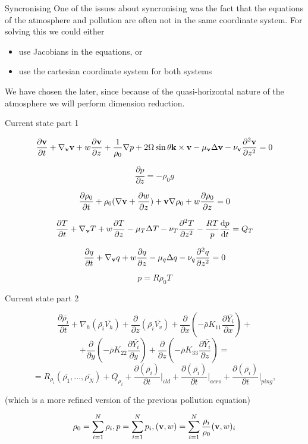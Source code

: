 \documentclass{beamer}
\begin{document}
\begin{frame}{Syncronising}
One of the issues about syncronising was the fact that the equations of the atmosphere and pollution are often not in the same coordinate system.
For solving this we could either
\begin{itemize}
\item use Jacobians in the equations, or
\item use the cartesian coordinate system for both systems
\end{itemize}
We have chosen the later, since because of the quasi-horizontal nature of the atmosphere we will perform dimension reduction. 
\end{frame}

\begin{frame}{Current state part 1}

\[ \frac{\partial \bold{v} }{\partial t} + \nabla_{\bold{v}}\bold{v} + w  \frac{\partial \bold{v} }{\partial z} + \frac{1}{\rho_0}\nabla p + 2 \Omega \sin \theta \bold{k} \times \bold{v}  -\mu_{\bold{v}}\Delta \bold{v}  -\nu_{\bold{v}} \frac{\partial ^ 2 \bold{v} }{\partial z^2} = 0  \]

\[ \frac{\partial p }{\partial z} = - \rho_0 g \]

\[ \frac{\partial \rho_0}{\partial t} + \rho_0 (\nabla \bold{v} + \frac{\partial w }{\partial z}) + \bold{v} \nabla \rho_0 + w \frac{\partial \rho_0}{\partial z} = 0 \]

\[ \frac{\partial T }{\partial t} + \nabla_{\bold{v}} T  + w  \frac{\partial T }{\partial z} - \mu_T \Delta T  -\nu_T \frac{\partial^2 T }{\partial z^2} -\frac{RT}{p} \frac{\mathrm{d}p}{\mathrm{d}t} = Q_T \]

\[ \frac{\partial q }{\partial t} + \nabla_{\bold{v}}q + w \frac{\partial q}{\partial z} - \mu_q \Delta q  - \nu_q \frac{\partial ^2 q }{\partial z^2} = 0 \]

\[ p = R \rho_0 T \]

\end{frame}

\begin{frame}{Current state part 2}

 \[ \frac{\partial \bar{\rho_i}}{\partial t}  + \nabla_{h} (\bar{\rho_i} \bar{V_h}) + \frac{\partial}{\partial z} (\bar{\rho_i} \bar{V_v}) + \frac{\partial}{\partial x} (-\bar{\rho}K_{11} \frac{\partial \bar{Y_i}}{\partial x}) + \]
 \[+ \frac{\partial}{\partial y} (-\bar{\rho}K_{22} \frac{\partial \bar{Y_i}}{\partial y}) + \frac{\partial}{\partial z} (- \bar{\rho} K_{33} \frac{\partial \bar{Y_i}}{\partial z}) = \]
 \[ = R_{\rho_i} (\bar{\rho_1}, \dots , \bar{\rho_N}) + Q_{\rho_i} + \frac{\partial (\bar{\rho_i})}{\partial t} \rvert_{cld} + \frac{\partial (\bar{\rho_i})}{\partial t} \rvert_{aero} + \frac{\partial (\bar{\rho_i})}{\partial t} \rvert_{ping},\]
 
 (which is a more refined version of the previous pollution equation)

\[ \rho_0 = \sum_{i =1}^{N} \rho_i, p = \sum_{i =1}^{N} p_i, (\bold{v}, w) = \sum_{i =1}^{N}\frac{\rho_i}{\rho_0} (\bold{v}, w)_i \]

\end{frame}
\end{document}
